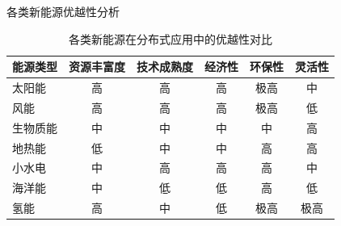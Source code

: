 \documentclass[aspectratio=169]{beamer}
\begin{document}
\begin{frame}{各类新能源优越性分析}
  \begin{table}
    \centering
    \small
    \begin{tabular}{lccccc}
      \toprule
      \textbf{能源类型} & \textbf{资源丰富度} & \textbf{技术成熟度} & \textbf{经济性} & \textbf{环保性} & \textbf{灵活性} \\
      \midrule
      太阳能 & \textcolor{green!70!black}{高} & \textcolor{green!70!black}{高} & \textcolor{green!70!black}{高} & \textcolor{green!70!black}{极高} & \textcolor{yellow!70!black}{中} \\
      风能 & \textcolor{green!70!black}{高} & \textcolor{green!70!black}{高} & \textcolor{green!70!black}{高} & \textcolor{green!70!black}{极高} & \textcolor{red!70!black}{低} \\
      生物质能 & \textcolor{yellow!70!black}{中} & \textcolor{yellow!70!black}{中} & \textcolor{yellow!70!black}{中} & \textcolor{yellow!70!black}{中} & \textcolor{green!70!black}{高} \\
      地热能 & \textcolor{red!70!black}{低} & \textcolor{yellow!70!black}{中} & \textcolor{yellow!70!black}{中} & \textcolor{green!70!black}{高} & \textcolor{green!70!black}{高} \\
      
      小水电 & \textcolor{yellow!70!black}{中} & \textcolor{green!70!black}{高} & \textcolor{green!70!black}{高} & \textcolor{green!70!black}{高} & \textcolor{yellow!70!black}{中} \\
      海洋能 & \textcolor{yellow!70!black}{中} & \textcolor{red!70!black}{低} & \textcolor{red!70!black}{低} & \textcolor{green!70!black}{高} & \textcolor{red!70!black}{低} \\
      氢能 & \textcolor{green!70!black}{高} & \textcolor{yellow!70!black}{中} & \textcolor{red!70!black}{低} & \textcolor{green!70!black}{极高} & \textcolor{green!70!black}{极高} \\
      
      \bottomrule
    \end{tabular}
    \caption{各类新能源在分布式应用中的优越性对比\cite{Chen2024}}
  \end{table}
\end{frame}
\end{document}
